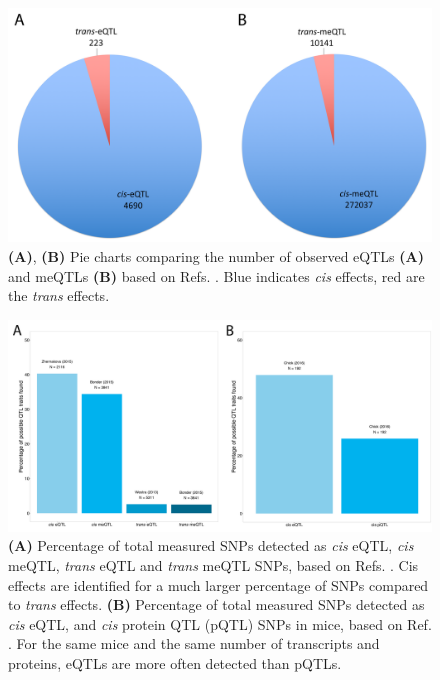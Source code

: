 \begin{figure}[H]
	\includegraphics[width=\textwidth]{chapters/chapter2-genetic-architecture/img/Figure2.png}
	\caption{\textbf{(A)}, \textbf{(B)} Pie charts comparing the number of observed eQTLs \textbf{(A)} and meQTLs \textbf{(B)} based on Refs. \cite{zhernakovaIdentificationContextdependentExpression2017,wongInterplayCisTrans2017}. Blue indicates \textit{cis} effects, red are the \textit{trans} effects.}
	\label{architecture_fig2}
\end{figure}

\begin{figure}[H]
	\includegraphics[width=\textwidth]{chapters/chapter2-genetic-architecture/img/Figure3.png}
	\caption{\textbf{(A)} Percentage of total measured SNPs detected as \textit{cis} eQTL, \textit{cis} meQTL, \textit{trans} eQTL and \textit{trans} meQTL SNPs, based on Refs. \cite{zhernakovaIdentificationContextdependentExpression2017,gibsonExpressionQuantitativeTrait2015,wongInterplayCisTrans2017}. Cis effects are identified for a much larger percentage of SNPs compared to \textit{trans} effects. \textbf{(B)} Percentage of total measured SNPs detected as \textit{cis} eQTL, and \textit{cis} protein QTL (pQTL) SNPs in mice, based on Ref. \cite{GenomeWideMetabolicQTL}. For the same mice and the same number of transcripts and proteins, eQTLs are more often detected than pQTLs.}
	\label{architecture_fig3}
\end{figure}

